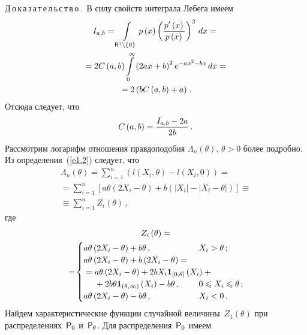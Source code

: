 \begin{multicols}{2}
\noindent
Д\,о\,к\,а\,з\,а\,т\,е\,л\,ь\,с\,т\,в\,о\,.\
В силу свойств интеграла Лебега имеем
\begin{multline*}
I_{a,b} =\int\limits_{{\sf R}^{1}\backslash \{ 0\}}
p\left(x\right)\left(\displaystyle\frac{\displaystyle p'\left(x\right)\mathstrut}{\displaystyle p\left(x\right)\mathstrut}
\right) ^{2}\,dx={}\\
{}=2C\left(a,b\right)\int\limits_{0}^{\infty}
\left(2a x+b\right)^{2}e^{-ax^{2} -bx}\,dx={}\\
{}=
2\left(bC\left(a,b\right)+a\right)\,. 
\end{multline*}
Отсюда следует, что
\begin{equation}
C\left(a,b\right)=\displaystyle\frac{\displaystyle I_{a,b}-2a\mathstrut}{\displaystyle 2b\mathstrut}\,. 
\label{e2.2}
\end{equation}
Рассмотрим логарифм отношения правдоподобия $\Lambda_{n}\left(\theta \right)$,
$\theta>0$ более подробно. Из определения~(\ref{e1.2}) следует, что
\begin{multline}
\Lambda_{n} \left(\theta \right)=
\sum_{i=1}^{n}\left(l\left(X_{i},\theta\right)-
l\left(X_{i},0\right)\right)={}\\
{}
=\sum_{i=1}^{n}\left[a \theta\left(2X_{i}
-\theta \right)+b \left(\left|X_{i} \right|-\left|X_{i}-\theta\right|\right)\right]
\equiv{}\\
{}\equiv \sum_{i=1}^{n}Z_{i}\left(\theta \right)\,, 
\label{e2.3}
\end{multline}
где
\begin{multline}
Z_{i} \left(\theta \right)=\\
=\!\begin{cases}
a\theta\left(2X_{i}-\theta \right)+b \theta\,,  & \!\!\!\!\!\!\!\!\!\!\!\!\!\!\!\!X_{i}>\theta\,;\\
a\theta \left(2X_{i}-\theta\right)+b\left(2X_{i}-\theta\right)={} &\\
{}= a\theta\left(2X_{i} -\theta\right)+2bX_{i}
{\IT}_{\left[0,\theta\right]}\left(X_{i}\right)+{} &\\
\ \ \ \ {}+2b\theta
{\IT}_{\left(\theta,\infty\right)}\left(X_{i}\right)- b\theta\,, &\!\!\!\!\!\!\!\!\!\! \!\!\!\!\!\!0\le X_{i}\le\theta\,;\\
a\theta\left(2X_{i}-\theta\right)-b\theta\,,  &\!\!\!\!\!\!\!\!\!\!\!\!\!\!\!\! X_{i}<0\,.
\end{cases}\!
\label{e2.4}
\end{multline}
Найдем характеристические функции случайной величины~$Z_{1}\left(\theta\right)$ 
при распределениях~${{\sf P}}_{0} $ и~${{\sf P}}_{\theta}$. Для распределения~${{\sf P}}_{0} $ имеем
\begin{multline}

\end{multline}
\end{multicols}
